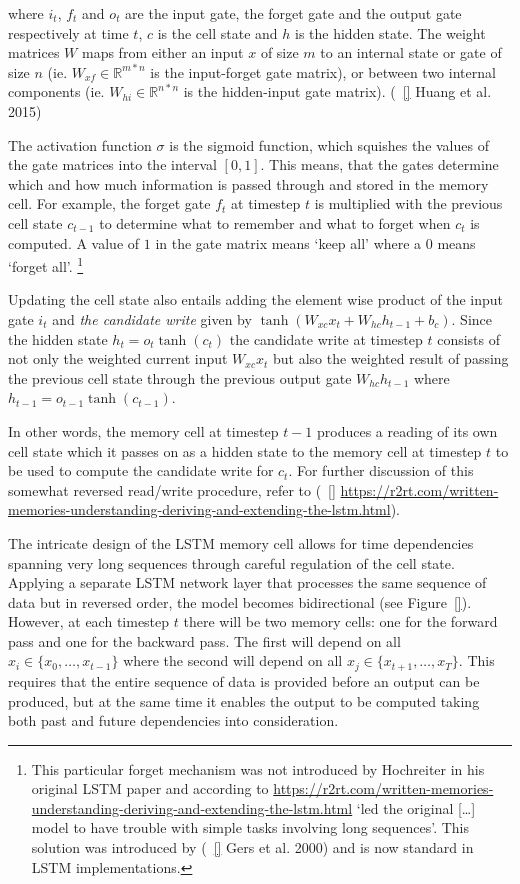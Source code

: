 where $i_{t}$, $f_{t}$ and $o_{t}$ are the input gate, the forget gate and the
output gate respectively at time $t$, $c$ is the cell state and $h$ is the
hidden state. The weight matrices $W$ maps from either an input $x$ of size $m$
to an internal state or gate of size $n$ (ie. $W_{xf} \in \mathbb{R}^{m*n}$ is
the input-forget gate matrix), or between two internal components (ie. $W_{hi}
\in \mathbb{R}^{n*n}$ is the hidden-input gate matrix). (~\ref{} Huang et al.
2015)

The activation function $\sigma$ is the sigmoid function, which squishes the
values of the gate matrices into the interval $[0,1]$. This means, that the
gates determine which and how much information is passed through and stored in
the memory cell. For example, the forget gate $f_{t}$ at timestep $t$ is
multiplied with the previous cell state $c_{t-1}$ to determine what to remember
and what to forget when $c_{t}$ is computed. A value of $1$ in the gate matrix
means `keep all' where a $0$ means `forget all'. \footnote{This particular
forget mechanism was not introduced by Hochreiter in his original LSTM paper and
according to
    \url{https://r2rt.com/written-memories-understanding-deriving-and-extending-the-lstm.html}
    `led the original [\ldots] model to have trouble with simple tasks involving
    long sequences'. This solution was introduced by (~\ref{} Gers et al. 2000)
and is now standard in LSTM implementations.}

Updating the cell state also entails adding the element wise product of the
input gate $i_{t}$ and \textit{the candidate write} given by $\tanh(W_{xc}x_{t}
+ W_{hc}h_{t-1} + b_{c})$. Since the hidden state $h_{t} = o_{t}\tanh(c_{t})$
the candidate write at timestep $t$ consists of not only the weighted current
input $W_{xc}x_{t}$ but also the weighted result of passing the previous cell
state through the previous output gate $W_{hc}h_{t-1}$ where $h_{t-1} =
o_{t-1}\tanh(c_{t-1})$.

In other words, the memory cell at timestep $t-1$ produces a reading of its own
cell state which it passes on as a hidden state to the memory cell at timestep
$t$ to be used to compute the candidate write for $c_{t}$. For further
discussion of this somewhat reversed read/write procedure, refer to (~\ref{}
\url{https://r2rt.com/written-memories-understanding-deriving-and-extending-the-lstm.html}).

The intricate design of the LSTM memory cell allows for time dependencies
spanning very long sequences through careful regulation of the cell state.
Applying a separate LSTM network layer that processes the same sequence of data
but in reversed order, the model becomes bidirectional (see Figure~\ref{}).
However, at each timestep $t$ there will be two memory cells: one for the
forward pass and one for the backward pass. The first will depend on all $x_{i}
\in \{x_{0}, \ldots, x_{t-1}\}$ where the second will depend on all $x_{j} \in
\{x_{t+1}, \ldots, x_{T}\}$. This requires that the entire sequence of data is
provided before an output can be produced, but at the same time it enables the
output to be computed taking both past and future dependencies into
consideration.



